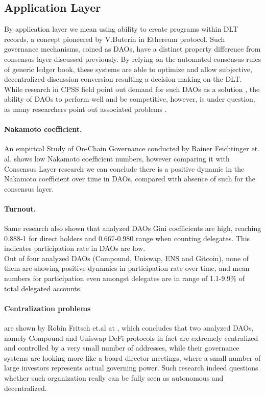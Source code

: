 \documentclass{article}
\begin{document}
\begin{CJK}{UTF8}{gbsn}
\begin{multicols}{2}
        \subsection{Application Layer}
        By application layer we mean using ability to create programs within DLT records, a concept pioneered by V.Buterin in Ethereum protocol. Such governance mechanisms, coined as DAOs, have a distinct property difference from consensus layer discussed previously. By relying on the automated consensus rules of generic ledger book, these systems are able to optimize and allow subjective, decentralized discussion conversion resulting a decision making on the DLT.
        While research in CPSS field point out demand for such DAOs as a solution \cite{Fei2016}\cite{Wang2022}\cite{Juanjuan2023}, the ability of DAOs to perform well and be competitive, however, is under question, as many researchers point out associated problems \cite{Rainer2023}\cite{Marcella2016}\cite{Xuan2024}.
        \paragraph{Nakamoto coefficient.} An empirical Study of On-Chain Governance conducted by Rainer Feichtinger et. al. \cite{Rainer2023} shows low Nakamoto coefficient numbers, however comparing it with Consensus Layer research \cite{Dominic2023} we can conclude there is a positive dynamic in the Nakamoto coefficient over time in DAOs, compared with absence of such for the consensus layer.
        \paragraph{Turnout.} Same research\cite{Rainer2023} also shown that analyzed DAOs Gini coefficients\cite{Lidia2012} are high, reaching 0.888-1 for direct holders and 0.667-0.980 range when counting delegates. This indicates participation rate in DAOs are low. \\Out of four analyzed DAOs (Compound, Uniswap, ENS and Gitcoin), none of them are showing positive dynamics in participation rate over time, and mean numbers for participation even amongst delegates are in range of 1.1-9.9\% of total delegated accounts.
        \paragraph{Centralization problems} are shown by Robin Fritsch et.al at \cite{Robin22}, which concludes that two analyzed DAOs, namely Compound and Uniswap DeFi protocols in fact are extremely centralized and controlled by a very small number of addresses, while their governance systems are looking more like a board director meetings, where a small number of large investors represents actual governing power. Such research indeed questions whether such organization really can be fully seen as autonomous and decentralized.



\end{multicols}
\end{CJK}
\end{document}
